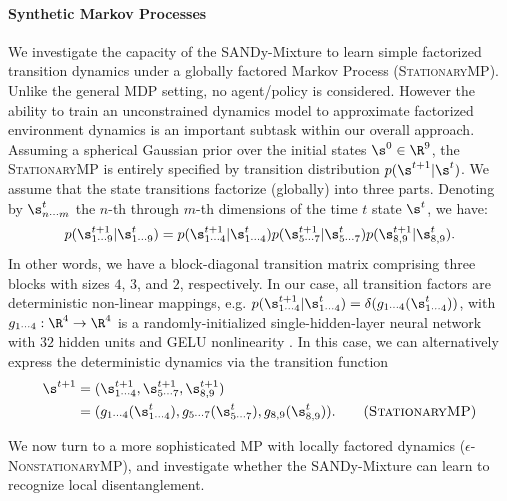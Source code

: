 \documentclass[coda.tex]{subfiles}
\begin{document}
\paragraph{Synthetic Markov Processes}
We investigate the capacity of the SANDy-Mixture to learn simple factorized transition dynamics under a globally factored Markov Process (\textsc{StationaryMP}).
Unlike the general MDP setting, no agent/policy is considered.
However the ability to train an unconstrained dynamics model to approximate factorized environment dynamics is an important subtask within our overall approach.
Assuming a spherical Gaussian prior over the initial states $\s^0 \in \R^9$, the \textsc{StationaryMP} is entirely specified by transition distribution $p(\s^{t+1}|\s^t)$.
We assume that the state transitions factorize (globally) into three parts.
Denoting by $\s_{n \cdots m}^t$ the $n$-th through $m$-th dimensions of the time $t$ state $\s^t$, we have:
\[
p(\s^{t+1}_{1\cdots9} | \s^{t}_{1\cdots9}) =
  p(\s^{t+1}_{1\cdots4} | \s^{t}_{1\cdots4})
  p(\s^{t+1}_{5\cdots7} | \s^{t}_{5\cdots7})
  p(\s^{t+1}_{8,9} | \s^{t}_{8,9}).
\]
In other words, we have a block-diagonal transition matrix comprising three blocks with sizes $4$, $3$, and $2$, respectively.
In our case, all transition factors are deterministic non-linear mappings, e.g. $p(\s^{t+1}_{1\cdots4} | \s^{t}_{1\cdots4}) = \delta(g_{1\cdots4}(\s^{t}_{1\cdots4}))$, with $g_{1\cdots4}: \R^{4} \rightarrow \R^{4}$ is a randomly-initialized single-hidden-layer neural network with $32$ hidden units and GELU nonlinearity \cite{hendrycks2016gaussian}.
In this case, we can alternatively express the deterministic dynamics via the transition function
\begin{align}\label{eq:StationaryMP}
\s^{t+1} &= (\s_{1\cdots4}^{t+1}, \s_{5\cdots7}^{t+1}, \s_{8, 9}^{t+1}) \nonumber\\ 
  &= (g_{1\cdots4}(\s_{1\cdots4}^{t}), g_{5\cdots7}(\s_{5\cdots7}^{t}), g_{8,9}(\s_{8,9}^{t})).
  \tag{\textsc{StationaryMP}}
\end{align}

We now turn to a more sophisticated MP with locally factored dynamics (\textsc{$\epsilon$-NonstationaryMP}), and investigate whether the SANDy-Mixture can learn to recognize local disentanglement. 
\end{document}
